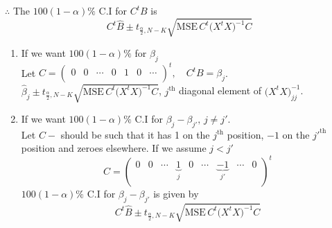 \documentclass[11pt,a4paper]{article}
\theoremstyle{definition}
\begin{document}
$\therefore$ The $100(1-\alpha)\%$ C.I for $C^tB$ is $$C^t\widehat{B}\pm t_{\frac{\alpha}{2},N-K}\sqrt{\text{MSE}\,C^t\big(X^tX\big)^{-1}C}$$

\begin{enumerate}
\item[a).] If we want $100(1-\alpha)\%$ for $\beta_j$\\

Let $C=
\begin{pmatrix}
0 & 0 & \cdots & 0 & 1 & 0 & \cdots\\
\end{pmatrix}^t
,\quad  C^tB=\beta_j$.\\

$\widehat{\beta}_j\pm t_{\frac{\alpha}{2},N-K}\sqrt{\text{MSE}\,C^t\big(X^tX\big)^{-1}C}$, $j^{\text{th}}$ diagonal element of $\big(X^tX\big)^{-1}_{jj}$.

\item[b).] If we want $100(1-\alpha)\%$ C.I for $\beta_j-\beta_{j'},\, j\neq j'$.\\

Let $C-$ should be such that it has 1 on the $j^{\text{th}}$ position, $-1$ on the $j'^{\text{th}}$ position and zeroes elsewhere. If we assume $j<j'$
$$C=
\begin{pmatrix}
0 & 0 & \cdots & \underbrace{1}_{j} & 0 &\cdots & \underbrace{-1}_{j'} & \cdots & 0\\
\end{pmatrix}^t
$$
$100(1-\alpha)\%$ C.I for $\beta_j-\beta_{j'}$ is given by 
$$C^t\widehat{B}\pm t_{\frac{\alpha}{2},N-K}\sqrt{\text{MSE}\,C^t\big(X^tX\big)^{-1}C}$$\\
\end{enumerate}
\end{document}
